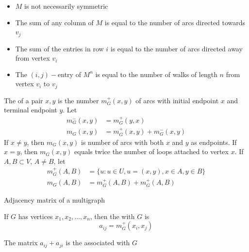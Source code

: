 \documentclass[aspectratio=43]{beamer}
\begin{document}
\begin{frame}
	\begin{theorem}[{Properties}]
	\begin{itemize}
	\item $M$ is not necessarily symmetric
	\item The sum of any column of $M$ is equal to the number of arcs directed towards $v_j$
	\item The sum of the entries in row $i$ is equal to the number of arcs directed away from vertex $v_i$
	\item The $(i,j)-$entry of $M^n$ is equal to the number of walks of length $n$ from vertex $v_i$ to $v_j$
	\end{itemize}
	\end{theorem}
\end{frame}
	
\begin{frame}
	\begin{definition}
		The  of a pair $x,y$ is the number $m_G^+(x,y)$ of arcs with initial endpoint $x$ and terminal endpoint $y$. Let
		\begin{align*}
			m_G^-(x,y) &= m_G^+(y,x) \\
			m_G(x,y) &= m_G^+(x,y)+m_G^-(x,y)
		\end{align*}
		If $x\neq y$, then $m_G(x,y)$ is number of arcs with both $x$ and $y$ as endpoints. If $x=y$, then $m_G(x,y)$ equals twice the number of loops attached to vertex $x$. If $A,B\subset V$, $A\neq B$, let
		\begin{align*}
			m_G^+(A,B) &= \{u:u\in U, u=(x,y),x\in A,y\in B\} \\
			m_G(A,B) &= m_G^+(A,B)+m_G^+(A,B)
		\end{align*}
	\end{definition}
\end{frame}

\begin{frame}{Adjacency matrix of a multigraph}
\begin{definition}
	If $G$ has vertices $x_1,x_2,\ldots,x_n$, then the  with $G$ is 
	\[
	a_{ij}=m_G^+(x_i,x_j)
	\]
\end{definition}
\vfill
\begin{definition}
	The matrix $a_{ij}+a_{ji}$ is the  associated with $G$
\end{definition}
\end{frame}
\end{document}
